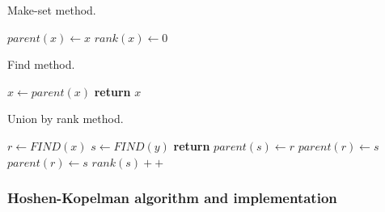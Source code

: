 \documentclass[a4paper]{article}
\begin{document}
\begin{algorithm}[H]
\caption{Make-set method.}
\begin{algorithmic}[1]
    \State $parent(x) \leftarrow x$
    \State $rank(x) \leftarrow 0$ 
\EndProcedure
\end{algorithmic}
\end{algorithm}

\begin{algorithm}[H]
\caption{Find method.}
\begin{algorithmic}[1]
    \State $x \leftarrow parent(x)$
    \EndWhile
\State \textbf{return} $x$
\EndProcedure
\end{algorithmic}
\end{algorithm}

\begin{algorithm}[H]
\caption{Union by rank method.}
\begin{algorithmic}[1]
    \State $r \leftarrow FIND (x)$
    \State $s \leftarrow FIND(y)$
      \State \textbf{return}  
        \State $parent(s) \leftarrow r$
        \State $parent(r) \leftarrow s$
    \Else{}
        \State $parent(r) \leftarrow s$
        \State $rank(s)++$
    \EndIf
\EndProcedure
\end{algorithmic}
\end{algorithm}








\subsubsection{Hoshen-Kopelman algorithm and implementation}
\end{document}
